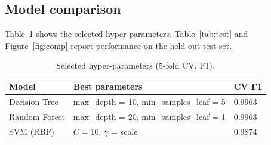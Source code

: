 \documentclass[12pt,a4paper]{article}
\begin{document}
\subsection{Model comparison}
Table~\ref{tab:tuning} shows the selected hyper-parameters. Table~\ref{tab:test} and Figure~\ref{fig:comp} report performance on the held-out test set.

\begin{table}[H]
\centering\small
\caption{Selected hyper-parameters (5-fold CV, F1).}\label{tab:tuning}
\begin{tabular}{lll}
\toprule
Model & Best parameters & CV F1 \\
\midrule
Decision Tree & max\_depth = 10, min\_samples\_leaf = 5 & 0.9963 \\
Random Forest & max\_depth = 20, min\_samples\_leaf = 1 & 0.9963 \\
SVM (RBF) & $C = 10$, $\gamma$ = scale & 0.9874 \\
\bottomrule
\end{tabular}
\end{table}

\begin{table}[H]
\centering\small
\caption{Test-set performance ($n=6{,}723$; 2{,}841 suspicious). Latency is per transaction, measured for batch scoring. Rule-baseline AUCs are computed from hard labels.}\label{tab:test}
\end{table}
\end{document}

